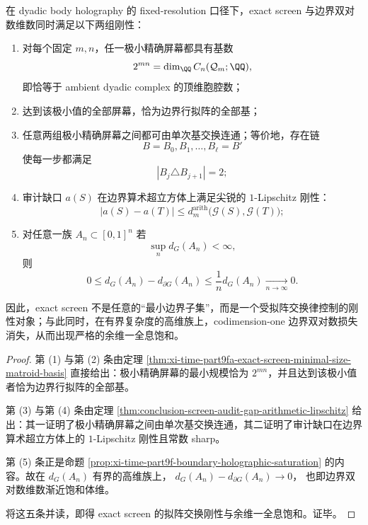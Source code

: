 \begin{theorem}\label{thm:conclusion-exact-screen-exchange-rigidity-codim1-saturation}
在 dyadic body holography 的 fixed-resolution 口径下，exact screen 与边界双对数维数同时满足以下两组刚性：
\begin{enumerate}
  \item 对每个固定 \(m,n\)，任一极小精确屏幕都具有基数
        \[
        2^{mn}=\dim_{\QQ}C_n(\mathcal Q_m;\QQ),
        \]
        即恰等于 ambient dyadic complex 的顶维胞腔数；
  \item 达到该极小值的全部屏幕，恰为边界行拟阵的全部基；
  \item 任意两组极小精确屏幕之间都可由单次基交换连通；等价地，存在链
        \[
        B=B_0,B_1,\dots,B_\ell=B'
        \]
        使每一步都满足
        \[
        |B_j\triangle B_{j+1}|=2;
        \]
  \item 审计缺口 \(a(S)\) 在边界算术超立方体上满足尖锐的 \(1\)-Lipschitz 刚性：
        \[
        |a(S)-a(T)|
        \le
        d_m^{\mathrm{arith}}\bigl(\mathcal G(S),\mathcal G(T)\bigr);
        \]
  \item 对任意一族 \(A_n\subset[0,1]^n\) 若
        \[
        \sup_n d_G(A_n)<\infty,
        \]
        则
        \[
        0\le d_G(A_n)-d_{\partial G}(A_n)\le \frac{1}{n}d_G(A_n)\xrightarrow[n\to\infty]{}0.
        \]
\end{enumerate}
因此，exact screen 不是任意的“最小边界子集”，而是一个受拟阵交换律控制的刚性对象；与此同时，在有界复杂度的高维族上，codimension-one 边界双对数损失消失，从而出现严格的余维一全息饱和。
\end{theorem}
\begin{proof}
第 (1) 与第 (2) 条由定理 \ref{thm:xi-time-part9fa-exact-screen-minimal-size-matroid-basis} 直接给出：极小精确屏幕的最小规模恰为
\(
2^{mn}
\)，并且达到该极小值者恰为边界行拟阵的全部基。

第 (3) 与第 (4) 条由定理 \ref{thm:conclusion-screen-audit-gap-arithmetic-lipschitz} 给出：其一证明了极小精确屏幕之间由单次基交换连通，其二证明了审计缺口在边界算术超立方体上的 \(1\)-Lipschitz 刚性且常数 sharp。

第 (5) 条正是命题 \ref{prop:xi-time-part9f-boundary-holographic-saturation} 的内容。故在 \(d_G(A_n)\) 有界的高维族上，
\(
d_G(A_n)-d_{\partial G}(A_n)\to 0
\)，
也即边界双对数维数渐近饱和体维。

将这五条并读，即得 exact screen 的拟阵交换刚性与余维一全息饱和。证毕。
\end{proof}

